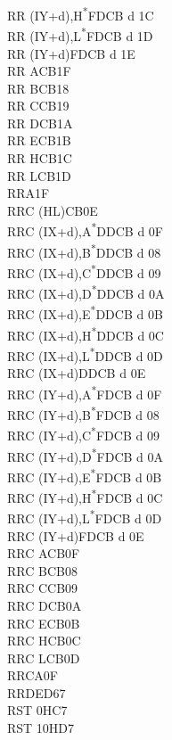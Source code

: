 \documentclass[twoside,openright,a4paper]{book}
\begin{document}
\begin{multicols}{3}
{\begin{tabbing}
	RR (IY+d),H\textsuperscript{*}\>FDCB d 1C\\
	RR (IY+d),L\textsuperscript{*}\>FDCB d 1D\\
	RR (IY+d)\>FDCB d 1E\\
	RR A\>CB1F\\
	RR B\>CB18\\
	RR C\>CB19\\
	RR D\>CB1A\\
	RR E\>CB1B\\
	RR H\>CB1C\\
	RR L\>CB1D\\
	RRA\>1F\\
	RRC (HL)\>CB0E\\
	RRC (IX+d),A\textsuperscript{*}\>DDCB d 0F\\
	RRC (IX+d),B\textsuperscript{*}\>DDCB d 08\\
	RRC (IX+d),C\textsuperscript{*}\>DDCB d 09\\
	RRC (IX+d),D\textsuperscript{*}\>DDCB d 0A\\
	RRC (IX+d),E\textsuperscript{*}\>DDCB d 0B\\
	RRC (IX+d),H\textsuperscript{*}\>DDCB d 0C\\
	RRC (IX+d),L\textsuperscript{*}\>DDCB d 0D\\
	RRC (IX+d)\>DDCB d 0E\\
	RRC (IY+d),A\textsuperscript{*}\>FDCB d 0F\\
	RRC (IY+d),B\textsuperscript{*}\>FDCB d 08\\
	RRC (IY+d),C\textsuperscript{*}\>FDCB d 09\\
	RRC (IY+d),D\textsuperscript{*}\>FDCB d 0A\\
	RRC (IY+d),E\textsuperscript{*}\>FDCB d 0B\\
	RRC (IY+d),H\textsuperscript{*}\>FDCB d 0C\\
	RRC (IY+d),L\textsuperscript{*}\>FDCB d 0D\\
	RRC (IY+d)\>FDCB d 0E\\
	RRC A\>CB0F\\
	RRC B\>CB08\\
	RRC C\>CB09\\
	RRC D\>CB0A\\
	RRC E\>CB0B\\
	RRC H\>CB0C\\
	RRC L\>CB0D\\
	RRCA\>0F\\
	RRD\>ED67\\
	RST 0H\>C7\\
	RST 10H\>D7\\

\end{tabbing}}
\end{multicols}
\end{document}
